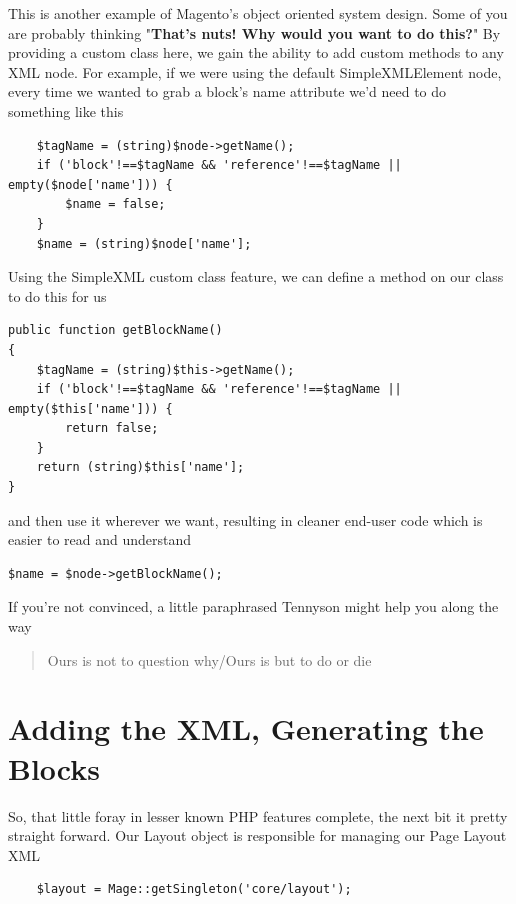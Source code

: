 \documentclass[oneside]{book}
\begin{document}
This is another example of Magento's object oriented system design. Some of you are probably thinking "\textbf{That's nuts! Why would you want to do this?}"  By providing a custom class here, we gain the ability to add custom methods to any XML node.  For example, if we were using the default SimpleXMLElement node, every time we wanted to grab a block's name attribute we'd need to do something like this

\begin{lstlisting}
    $tagName = (string)$node->getName();
    if ('block'!==$tagName && 'reference'!==$tagName || empty($node['name'])) {
        $name = false;
    }
    $name = (string)$node['name'];

\end{lstlisting}


Using the SimpleXML custom class feature, we can define a method on our class to do this for us

\begin{lstlisting}
public function getBlockName()
{
    $tagName = (string)$this->getName();
    if ('block'!==$tagName && 'reference'!==$tagName || empty($this['name'])) {
        return false;
    }
    return (string)$this['name'];
}

\end{lstlisting}


and then use it wherever we want, resulting in cleaner end-user code which is easier to read and understand

\begin{lstlisting}
$name = $node->getBlockName();

\end{lstlisting}


If you're not convinced, a little paraphrased Tennyson might help you along the way

\begin{quote}
Ours is not to question why/Ours is but to do or die
\end{quote}

\section{Adding the XML, Generating the Blocks}

So, that little foray in lesser known PHP features complete, the next bit it pretty straight forward.  Our Layout object is responsible for managing our  Page Layout XML

\begin{lstlisting}
    $layout = Mage::getSingleton('core/layout');

\end{lstlisting}
\end{document}
